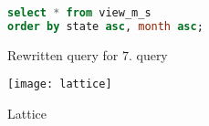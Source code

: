 \begin{figure}[!hbp]
\begin{lstlisting}[language=sql] 
select * from view_m_s
order by state asc, month asc;
\end{lstlisting}
\caption{\label{s:requery_7} Rewritten query for $7$. query}
\end{figure}




\begin{figure}[!htp]
\begin{center}
  \texttt{[image: lattice]}
\caption{\label{fig:lattice}  Lattice}
\end{center}
\end{figure}


